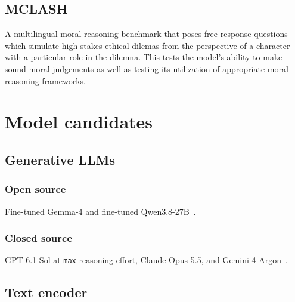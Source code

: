 \documentclass{article}
\begin{document}
\subsection{MCLASH}
A multilingual moral reasoning benchmark that poses free response questions which simulate high-stakes ethical dilemas from the perspective of a character with a particular role in the dilemna. This tests the model's ability to make sound moral judgements as well as testing its utilization of appropriate moral reasoning frameworks.\cite{MET}

\section{Model candidates}
\subsection{Generative LLMs}
\subsubsection{Open source}
Fine-tuned Gemma-4 and fine-tuned Qwen3.8-27B~\cite{ModelDocs}.

\subsubsection{Closed source}
GPT-6.1 Sol at \texttt{max} reasoning effort, Claude Opus 5.5, and Gemini 4 Argon~\cite{ModelDocs}.

\subsection{Text encoder}
\end{document}
